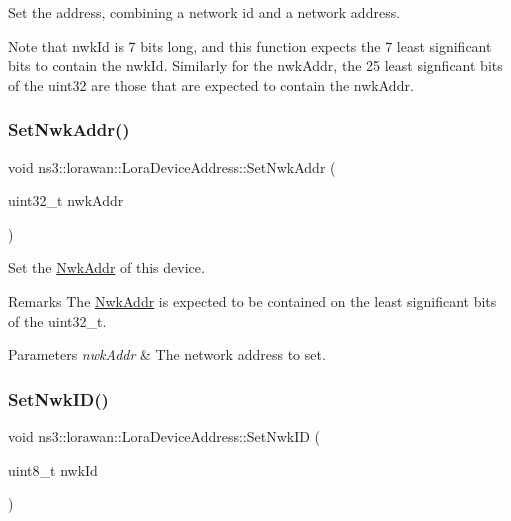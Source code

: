 Set the address, combining a network id and a network address.

Note that nwk\+Id is 7 bits long, and this function expects the 7 least significant bits to contain the nwk\+Id. Similarly for the nwk\+Addr, the 25 least signficant bits of the uint32 are those that are expected to contain the nwk\+Addr. \mbox{\label{classns3_1_1lorawan_1_1LoraDeviceAddress_a754b437f47c3ddcff15ccf060033ad62}} 
\subsubsection{\texorpdfstring{Set\+Nwk\+Addr()}{SetNwkAddr()}}
{\footnotesize\ttfamily void ns3\+::lorawan\+::\+Lora\+Device\+Address\+::\+Set\+Nwk\+Addr (\begin{DoxyParamCaption}\item[{uint32\+\_\+t}]{nwk\+Addr }\end{DoxyParamCaption})}

Set the \hyperlink{classns3_1_1lorawan_1_1NwkAddr}{Nwk\+Addr} of this device.

\begin{DoxyRemark}{Remarks}
The \hyperlink{classns3_1_1lorawan_1_1NwkAddr}{Nwk\+Addr} is expected to be contained on the least significant bits of the uint32\+\_\+t.
\end{DoxyRemark}

\begin{DoxyParams}{Parameters}
{\em nwk\+Addr} & The network address to set. \\
\hline
\end{DoxyParams}
\mbox{\label{classns3_1_1lorawan_1_1LoraDeviceAddress_a0629f296a4c397d67a17eddc6d4695d7}} 
\subsubsection{\texorpdfstring{Set\+Nwk\+I\+D()}{SetNwkID()}}
{\footnotesize\ttfamily void ns3\+::lorawan\+::\+Lora\+Device\+Address\+::\+Set\+Nwk\+ID (\begin{DoxyParamCaption}\item[{uint8\+\_\+t}]{nwk\+Id }\end{DoxyParamCaption})}

